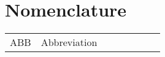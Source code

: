 
\chapter*{Nomenclature}


\begin{flushleft}
\begin{tabular}{l p{0.8\linewidth}}
	ABB  & Abbreviation
\end{tabular}
\end{flushleft}

